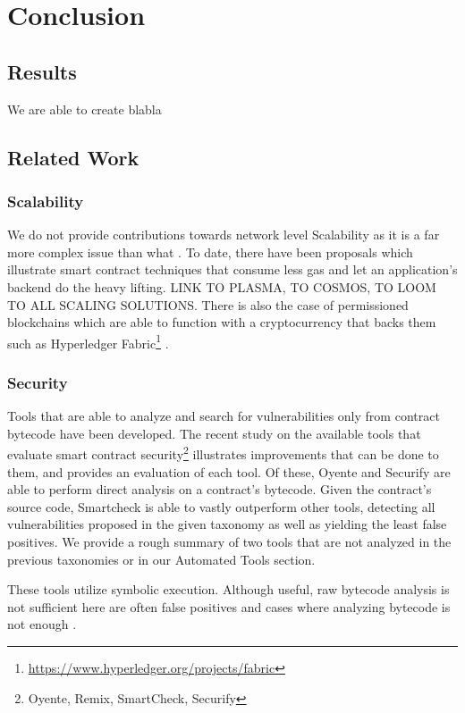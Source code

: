\chapter{Conclusion}
\section{Results} \label{scresults}
We are able to create blabla

\section{Related Work}

\subsection{Scalability}
We do not provide contributions towards network level Scalability as it is a far more complex issue than what . To date, there have been proposals \cite{stateless} which illustrate smart contract techniques that consume less gas and let an application's backend do the heavy lifting. LINK TO PLASMA, TO COSMOS, TO LOOM TO ALL SCALING SOLUTIONS. There is also the case of permissioned blockchains which are able to function with a cryptocurrency that backs them such as Hyperledger Fabric\footnote{\url{https://www.hyperledger.org/projects/fabric}} \cite{Vukolic:2017:RPB:3055518.3055526}.

\subsection{Security}
Tools that are able to analyze and search for vulnerabilities only from contract bytecode have been developed\cite{Luu:2016:MSC:2976749.2978309, greedyprodigal, mythril}. The recent study\cite{tools} on the available tools that evaluate smart contract security\footnote{Oyente, Remix, SmartCheck, Securify} illustrates improvements that can be done to them, and provides an evaluation of each tool. Of these, Oyente and Securify are able to perform direct analysis on a contract's bytecode. Given the contract's source code, Smartcheck is able to vastly outperform other tools, detecting all vulnerabilities proposed in the given taxonomy as well as yielding the least false positives. We provide a rough summary of two tools that are not analyzed in the previous taxonomies or in our Automated Tools section.

These tools utilize symbolic execution. Although useful, raw bytecode analysis is not sufficient here are often false positives and cases where analyzing bytecode is not enough \cite{zeus}. 

